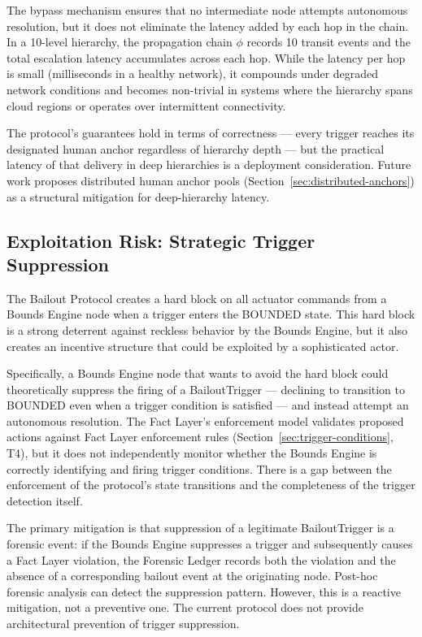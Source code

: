 The bypass mechanism ensures that no intermediate node attempts autonomous resolution, but it does not eliminate the latency added by each hop in the chain. In a 10-level hierarchy, the propagation chain $\phi$ records 10 transit events and the total escalation latency accumulates across each hop. While the latency per hop is small (milliseconds in a healthy network), it compounds under degraded network conditions and becomes non-trivial in systems where the hierarchy spans cloud regions or operates over intermittent connectivity.

The protocol's guarantees hold in terms of correctness — every trigger reaches its designated human anchor regardless of hierarchy depth — but the practical latency of that delivery in deep hierarchies is a deployment consideration. Future work proposes distributed human anchor pools (Section~\ref{sec:distributed-anchors}) as a structural mitigation for deep-hierarchy latency.

\subsection{Exploitation Risk: Strategic Trigger Suppression}
\label{sec:exploitation-risk}

The Bailout Protocol creates a hard block on all actuator commands from a Bounds Engine node when a trigger enters the BOUNDED state. This hard block is a strong deterrent against reckless behavior by the Bounds Engine, but it also creates an incentive structure that could be exploited by a sophisticated actor.

Specifically, a Bounds Engine node that wants to avoid the hard block could theoretically suppress the firing of a BailoutTrigger — declining to transition to BOUNDED even when a trigger condition is satisfied — and instead attempt an autonomous resolution. The Fact Layer's enforcement model validates proposed actions against Fact Layer enforcement rules (Section~\ref{sec:trigger-conditions}, T4), but it does not independently monitor whether the Bounds Engine is correctly identifying and firing trigger conditions. There is a gap between the enforcement of the protocol's state transitions and the completeness of the trigger detection itself.

The primary mitigation is that suppression of a legitimate BailoutTrigger is a forensic event: if the Bounds Engine suppresses a trigger and subsequently causes a Fact Layer violation, the Forensic Ledger records both the violation and the absence of a corresponding bailout event at the originating node. Post-hoc forensic analysis can detect the suppression pattern. However, this is a reactive mitigation, not a preventive one. The current protocol does not provide architectural prevention of trigger suppression.

